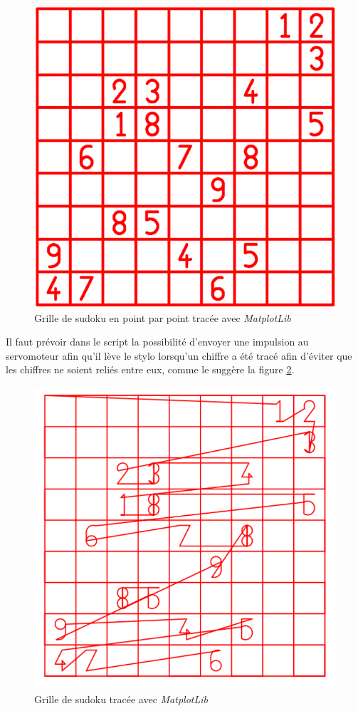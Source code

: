 \documentclass[12pt,a4paper]{report}
\begin{document}
\begin{figure}[!h]
 \center
 \includegraphics[scale=0.42]{../pictures/Sudoku_points}
 \caption{Grille de sudoku en point par point tracée avec \emph{MatplotLib}}
 \label{sudoku_points}
\end{figure}

Il faut prévoir dans le script la possibilité d'envoyer une impulsion au servomoteur afin qu'il lève le stylo lorsqu'un chiffre a été tracé afin d'éviter que les chiffres ne soient reliés entre eux, comme le suggère la figure \ref{sudoku_trace}.

\begin{figure}[!h]
 \center
 \includegraphics[scale=0.45]{../pictures/Sudoku_relies}
 \caption{Grille de sudoku tracée avec \emph{MatplotLib}}
 \label{sudoku_trace}
\end{figure}
\end{document}
